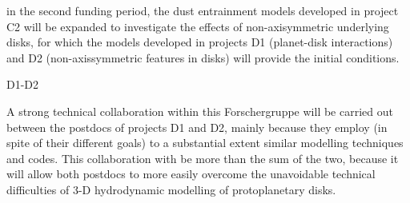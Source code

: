 \documentclass[10pt,fleqn,twoside]{article}
\begin{document}
in the second funding period, the dust entrainment models developed in
project C2 will be expanded to investigate the effects of
non-axisymmetric underlying disks, for which the models developed in
projects D1 (planet-disk interactions) and D2 (non-axissymmetric
features in disks) will provide the initial conditions.  \\
\begin{Emphasize}  D1-D2 \end{Emphasize} A strong technical 
  collaboration within this Forschergruppe will be carried
  out between the postdocs of projects D1 and D2, mainly because
  they employ (in spite of their different goals) to a substantial
  extent similar modelling techniques and codes. This
  collaboration with be more than the sum of the two, because it will
  allow both postdocs to more easily overcome the unavoidable technical
  difficulties of 3-D hydrodynamic modelling of protoplanetary disks.
% 
\\
\end{document}
